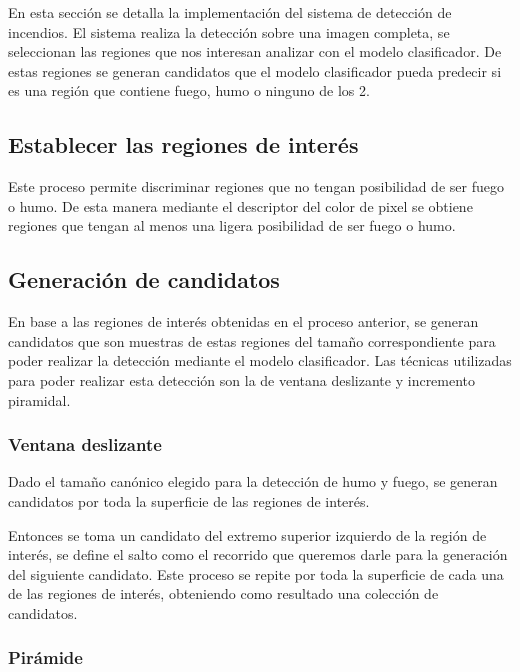 \noindent En esta sección se detalla la implementación del sistema de detección de incendios. El sistema realiza la detección sobre una imagen completa, se seleccionan las regiones que nos interesan analizar con el modelo clasificador. De estas regiones se generan candidatos que el modelo clasificador pueda predecir si es una región que contiene fuego, humo o ninguno de los 2.

\subsection{Establecer las regiones de interés}

\noindent Este proceso permite discriminar regiones que no tengan posibilidad de ser fuego o humo. De esta manera mediante el descriptor del color de pixel se obtiene regiones que tengan al menos una ligera posibilidad de ser fuego o humo.

\subsection{Generación de candidatos}

\noindent En base a las regiones de interés obtenidas en el proceso anterior, se generan candidatos que son muestras de estas regiones del tamaño correspondiente para poder realizar la detección mediante el modelo clasificador. Las técnicas utilizadas para poder realizar esta detección son la de ventana deslizante y incremento piramidal.

\subsubsection{Ventana deslizante}

\noindent Dado el tamaño canónico elegido para la detección de humo y fuego, se generan candidatos por toda la superficie de las regiones de interés.

\noindent Entonces se toma un candidato del extremo superior izquierdo de la región de interés, se define el salto como el recorrido que queremos darle para la generación del siguiente candidato. Este proceso se repite por toda la superficie de cada una de las regiones de interés, obteniendo como resultado una colección de candidatos.

\subsubsection{Pirámide}

